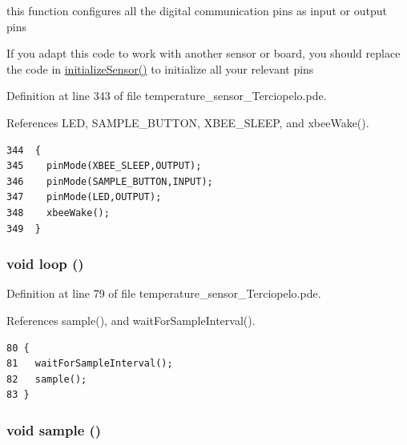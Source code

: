 this function configures all the digital communication pins as input or output pins 

If you adapt this code to work with another sensor or board, you should replace the code in \hyperlink{temperature__sensor__board__v2_8h_f6c9587ccbcf223f8c79f508c2fef366}{initializeSensor()} to initialize all your relevant pins 

Definition at line 343 of file temperature\_\-sensor\_\-Terciopelo.pde.

References LED, SAMPLE\_\-BUTTON, XBEE\_\-SLEEP, and xbeeWake().

\begin{Code}\begin{verbatim}344  {
345    pinMode(XBEE_SLEEP,OUTPUT);
346    pinMode(SAMPLE_BUTTON,INPUT);
347    pinMode(LED,OUTPUT);
348    xbeeWake();
349  }  
\end{verbatim}
\end{Code}


\hypertarget{temperature__sensor___terciopelo_8pde_fe461d27b9c48d5921c00d521181f12f}{
\subsubsection[{loop}]{\setlength{\rightskip}{0pt plus 5cm}void loop ()}}
\label{temperature__sensor___terciopelo_8pde_fe461d27b9c48d5921c00d521181f12f}




Definition at line 79 of file temperature\_\-sensor\_\-Terciopelo.pde.

References sample(), and waitForSampleInterval().

\begin{Code}\begin{verbatim}80 {
81   waitForSampleInterval();
82   sample();
83 }
\end{verbatim}
\end{Code}


\hypertarget{temperature__sensor___terciopelo_8pde_50a2ce599e896bfb535e70a42003ed23}{
\subsubsection[{sample}]{\setlength{\rightskip}{0pt plus 5cm}void sample ()}}
\label{temperature__sensor___terciopelo_8pde_50a2ce599e896bfb535e70a42003ed23}




